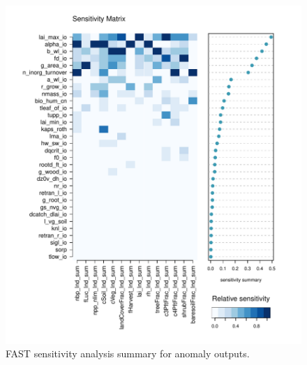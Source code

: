 \documentclass[gmd, manuscript]{copernicus}
\begin{document}
\begin{figure}[t]
\includegraphics[width=12cm]{./figs/FAST_sensmat_YAnom_level1a_wave01.pdf}
\caption{FAST sensitivity analysis summary for anomaly outputs.}
\label{fig:FAST_sensmat_YAnom_level1a}
\end{figure}



\noappendix       %




\appendixfigures  %
\end{document}
